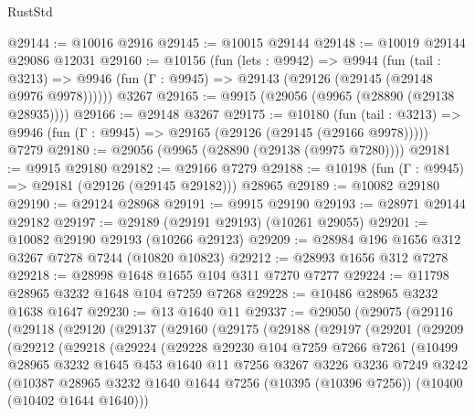 \begin{lexlean}{RustStd}
\begin{coremodule}
@29144 := @10016 @2916
@29145 := @10015 @29144
@29148 := @10019 @29144 @29086 @12031
@29160 := @10156
    (fun (lets : @9942) =>
    @9944
      (fun (tail : @3213) =>
      @9946 (fun (Γ : @9945) => @29143 (@29126 (@29145 (@29148 @9976 @9978))))))
    @3267
@29165 := @9915 (@29056 (@9965 (@28890 (@29138 @28935))))
@29166 := @29148 @3267
@29175 := @10180
    (fun (tail : @3213) => @9946 (fun (Γ : @9945) => @29165 (@29126 (@29145 (@29166 @9978)))))
    @7279
@29180 := @29056 (@9965 (@28890 (@29138 (@9975 @7280))))
@29181 := @9915 @29180
@29182 := @29166 @7279
@29188 := @10198 (fun (Γ : @9945) => @29181 (@29126 (@29145 @29182))) @28965
@29189 := @10082 @29180
@29190 := @29124 @28968
@29191 := @9915 @29190
@29193 := @28971 @29144 @29182
@29197 := @29189 (@29191 @29193) (@10261 @29055)
@29201 := @10082 @29190 @29193 (@10266 @29123)
@29209 := @28984 @196 @1656 @312 @3267 @7278 @7244 (@10820 @10823)
@29212 := @28993 @1656 @312 @7278
@29218 := @28998 @1648 @1655 @104 @311 @7270 @7277
@29224 := @11798 @28965 @3232 @1648 @104 @7259 @7268
@29228 := @10486 @28965 @3232 @1638 @1647
@29230 := @13 @1640 @11
@29337 := @29050
    (@29075
      (@29116
        (@29118
          (@29120
            (@29137
              (@29160
                (@29175
                  (@29188
                    (@29197
                      (@29201
                        (@29209
                          (@29212
                            (@29218
                              (@29224
                                (@29228
                                  @29230
                                  @104
                                  @7259
                                  @7266
                                  @7261
                                  (@10499
                                    @28965
                                    @3232
                                    @1645
                                    @453
                                    @1640
                                    @11
                                    @7256
                                    @3267
                                    @3226
                                    @3236
                                    @7249
                                    @3242
                                    (@10387
                                      @28965
                                      @3232
                                      @1640
                                      @1644
                                      @7256
                                      (@10395 (@10396 @7256))
                                      (@10400 (@10402 @1644 @1640)))

\end{coremodule}
\end{lexlean}

